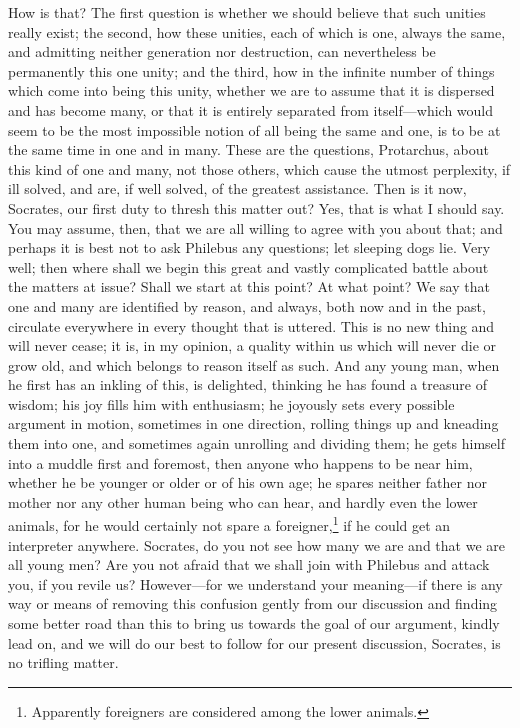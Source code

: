 \documentclass[letterpaper,12pt]{article}
\newcommand{\stephpag}[1]{\marginnote{\small\itshape\fontfamily{ppl}\selectfont #1}}
\begin{document}
\begin{drama}
\protarchusspeaks
How is that? \stephpag{b}
\socratesspeaks
The first question is whether we should believe that such unities really exist; the second, how these unities, each of which is one, always the same, and admitting neither generation nor destruction, can nevertheless be permanently this one unity; and the third, how in the infinite number of things which come into being this unity, whether we are to assume that it is dispersed and has become many, or that it is entirely separated from itself---which would seem to be the most impossible notion of all being the same and one, is to be at the same time in one and in many. These are the questions, Protarchus, about this kind of one and many, \stephpag{c} not those others, which cause the utmost perplexity, if ill solved, and are, if well solved, of the greatest assistance.
\protarchusspeaks
Then is it now, Socrates, our first duty to thresh this matter out?
\socratesspeaks
Yes, that is what I should say.
\protarchusspeaks
You may assume, then, that we are all willing to agree with you about that; and perhaps it is best not to ask Philebus any questions; let sleeping dogs lie. \stephpag{d}
\socratesspeaks
Very well; then where shall we begin this great and vastly complicated battle about the matters at issue? Shall we start at this point?
\protarchusspeaks
At what point?
\socratesspeaks
We say that one and many are identified by reason, and always, both now and in the past, circulate everywhere in every thought that is uttered. This is no new thing and will never cease; it is, in my opinion, a quality within us which will never die or grow old, and which belongs to reason itself as such. And any young man, when he first has an inkling of this, is delighted, \stephpag{e} thinking he has found a treasure of wisdom; his joy fills him with enthusiasm; he joyously sets every possible argument in motion, sometimes in one direction, rolling things up and kneading them into one, and sometimes again unrolling and dividing them; he gets himself into a muddle first and foremost, then anyone who happens to be near him, whether he be younger or older or of his own age; \stephpag{16 a} he spares neither father nor mother nor any other human being who can hear, and hardly even the lower animals, for he would certainly not spare a foreigner,\footnote{Apparently foreigners are considered among the lower animals.} if he could get an interpreter anywhere.
\protarchusspeaks
Socrates, do you not see how many we are and that we are all young men? Are you not afraid that we shall join with Philebus and attack you, if you revile us? However---for we understand your meaning---if there is any way or means of removing this confusion gently from our discussion \stephpag{b} and finding some better road than this to bring us towards the goal of our argument, kindly lead on, and we will do our best to follow for our present discussion, Socrates, is no trifling matter.

\end{drama}
\end{document}
